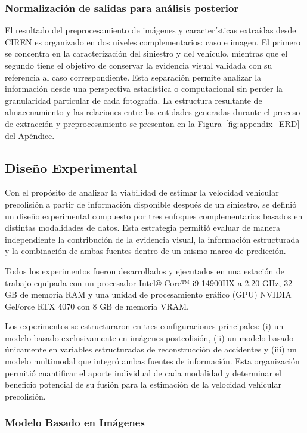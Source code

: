\documentclass[esp]{SpeedEstimationAI_paper}
\begin{document}
\subsubsection{Normalización de salidas para análisis posterior}

El resultado del preprocesamiento de imágenes y características extraídas desde CIREN es organizado en dos niveles complementarios: caso e imagen. El primero se concentra en la caracterización del siniestro y del vehículo, mientras que el segundo tiene el objetivo de conservar la evidencia visual validada con su referencia al caso correspondiente. Esta separación permite analizar la información desde una perspectiva estadística o computacional sin perder la granularidad particular de cada fotografía. La estructura resultante de almacenamiento y las relaciones entre las entidades generadas durante el proceso de extracción y preprocesamiento se presentan en la Figura~\ref{fig:appendix_ERD} del Apéndice.

\subsection{Diseño Experimental}

Con el propósito de analizar la viabilidad de estimar la velocidad vehicular precolisión a partir de información disponible después de un siniestro, se definió un diseño experimental compuesto por tres enfoques complementarios basados en distintas modalidades de datos. Esta estrategia permitió evaluar de manera independiente la contribución de la evidencia visual, la información estructurada y la combinación de ambas fuentes dentro de un mismo marco de predicción.

Todos los experimentos fueron desarrollados y ejecutados en una estación de trabajo equipada con un procesador Intel® Core™ i9-14900HX a 2.20 GHz, 32 GB de memoria RAM y una unidad de procesamiento gráfico (GPU) NVIDIA GeForce RTX 4070 con 8 GB de memoria VRAM. 

Los experimentos se estructuraron en tres configuraciones principales: (i) un modelo basado exclusivamente en imágenes postcolisión, (ii) un modelo basado únicamente en variables estructuradas de reconstrucción de accidentes y (iii) un modelo multimodal que integró ambas fuentes de información. Esta organización permitió cuantificar el aporte individual de cada modalidad y determinar el beneficio potencial de su fusión para la estimación de la velocidad vehicular precolisión.

\subsubsection{Modelo Basado en Imágenes}
\end{document}

